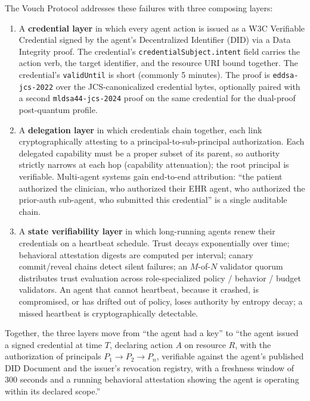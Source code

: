 \documentclass[11pt,a4paper]{article}
\begin{document}
The Vouch Protocol addresses these failures with three composing layers:

\begin{enumerate}[label=\textbf{\arabic*.},leftmargin=*]
\item A \textbf{credential layer} in which every agent action is issued as a W3C Verifiable Credential signed by the agent's Decentralized Identifier (DID) via a Data Integrity proof. The credential's \verb|credentialSubject.intent| field carries the action verb, the target identifier, and the resource URI bound together. The credential's \verb|validUntil| is short (commonly 5 minutes). The proof is \texttt{eddsa-jcs-2022} over the JCS-canonicalized credential bytes, optionally paired with a second \texttt{mldsa44-jcs-2024} proof on the same credential for the dual-proof post-quantum profile.

\item A \textbf{delegation layer} in which credentials chain together, each link cryptographically attesting to a principal-to-sub-principal authorization. Each delegated capability must be a proper subset of its parent, so authority strictly narrows at each hop (capability attenuation); the root principal is verifiable. Multi-agent systems gain end-to-end attribution: ``the patient authorized the clinician, who authorized their EHR agent, who authorized the prior-auth sub-agent, who submitted this credential'' is a single auditable chain.

\item A \textbf{state verifiability layer} in which long-running agents renew their credentials on a heartbeat schedule. Trust decays exponentially over time; behavioral attestation digests are computed per interval; canary commit/reveal chains detect silent failures; an $M$-of-$N$ validator quorum distributes trust evaluation across role-specialized policy / behavior / budget validators. An agent that cannot heartbeat, because it crashed, is compromised, or has drifted out of policy, loses authority by entropy decay; a missed heartbeat is cryptographically detectable.
\end{enumerate}

Together, the three layers move from ``the agent had a key'' to ``the agent issued a signed credential at time $T$, declaring action $A$ on resource $R$, with the authorization of principals $P_1 \to P_2 \to P_n$, verifiable against the agent's published DID Document and the issuer's revocation registry, with a freshness window of 300 seconds and a running behavioral attestation showing the agent is operating within its declared scope.''
\end{document}

